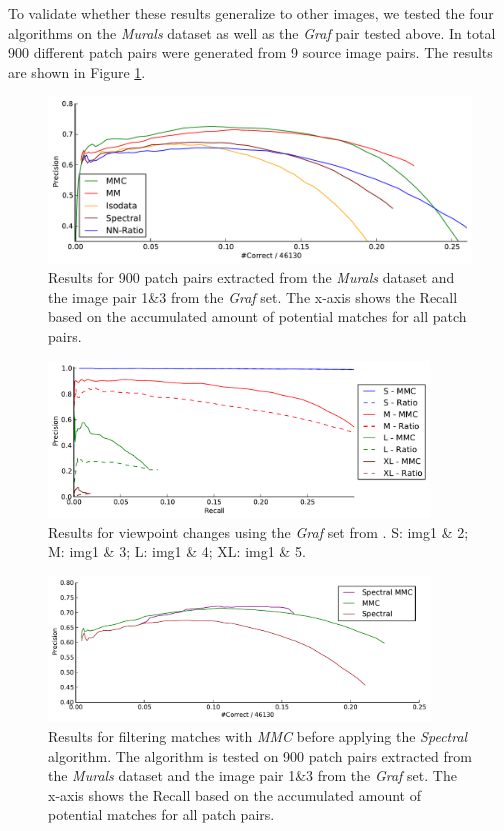 To validate whether these results generalize to other images, we tested 
the four algorithms on the \emph{Murals} dataset as well as the 
\emph{Graf} pair tested above.  In total 900 different patch pairs were 
generated from 9 source image pairs.  The results are shown in Figure 
\ref{fig:result_accumulated}. 
%
\begin{figure}[htb]
	\centering
    \includegraphics[width=0.9\columnwidth]{images/result_accumulated}
	\caption{Results for 900 patch pairs extracted from the 
	\emph{Murals} dataset and the image pair 1\&3 from the \emph{Graf} 
	set.  The x-axis shows the Recall based on the accumulated amount of 
potential matches for all patch pairs.}
	\label{fig:result_accumulated}
\end{figure}
%
\begin{figure}[htb]
	\centering
    \includegraphics[width=0.9\textwidth]{images/result_viewpoint}
    \caption{Results for viewpoint changes using the \emph{Graf} set 
    from \cite{mikolajczyk2005performance}.  S: img1 \& 2; M: img1 \& 3; 
    L: img1 \& 4; XL: img1 \& 5.}
	\label{fig:result_viewpoint}
\end{figure}
%
\begin{figure}[htb]
	\centering
    \includegraphics[width=0.9\textwidth]{images/result_spectral-mmc}
	\caption{Results for filtering matches with \emph{MMC} before 
	applying the \emph{Spectral} algorithm. The algorithm is tested on 
900 patch pairs extracted from the \emph{Murals} dataset and the image 
pair 1\&3 from the \emph{Graf} set. The x-axis shows the Recall based on 
the accumulated amount of potential matches for all patch pairs.}
	\label{fig:result_spectral-mmc}
\end{figure}
